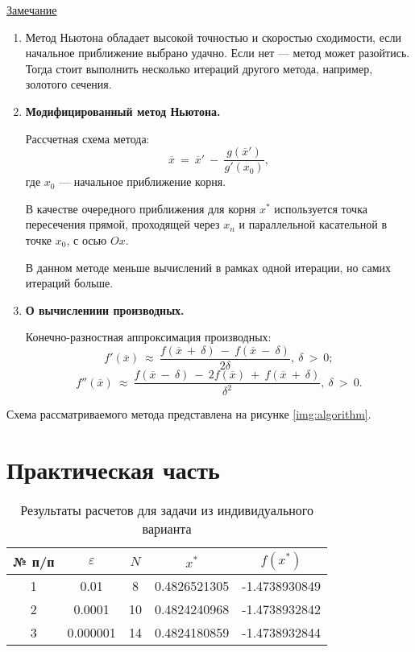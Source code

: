 \documentclass{bmstu}
\begin{document}
\underline{Замечание}
\begin{enumerate}
    \item Метод Ньютона обладает высокой точностью и скоростью сходимости, если начальное приближение выбрано удачно. Если нет --- метод может разойтись. Тогда стоит выполнить несколько итераций другого метода, например, золотого сечения.
    \item \textbf{Модифицированный метод Ньютона.}
    
        Рассчетная схема метода:
        \begin{equation}
            \overline{x} \ = \ \overline{x}' \ - \ \frac{g(\overline{x}')}{g'(x_0)},
        \end{equation}
        где $x_0$ --- начальное приближение корня.

        В качестве очередного приближения для корня $x^*$ используется точка пересечения прямой, проходящей через $x_n$ и параллельной касательной в точке $x_0$, с осью $Ox$.

        В данном методе меньше вычислений в рамках одной итерации, но самих итераций больше.
    \item \textbf{О вычислениии производных.}
        
        Конечно-разностная аппроксимация производных:
        \begin{equation}
            f'(\overline{x}) \ \approx \ \frac{f(\overline{x} \ + \ \delta) \ - \ f(\overline{x} \ - \ \delta)}{2 \delta}, \ \delta \ > \ 0;
        \end{equation}
        \begin{equation}
            f''(\overline{x}) \ \approx \ \frac{f(\overline{x} \ - \ \delta) \ - \ 2f(\overline{x}) \ + \ f(\overline{x} \ + \ \delta)}{\delta^2}, \ \delta \ > \ 0.
        \end{equation}
\end{enumerate}

Схема рассматриваемого метода представлена на рисунке \ref{img:algorithm}. 



\chapter{Практическая часть}

\begin{table}[H]
    \centering
	\caption{Результаты расчетов для задачи из индивидуального варианта}
    \label{tbl:task}
	\begin{tabular}{|c|c|c|c|c|}
        \hline
        № п/п & $\varepsilon$ & $N$ & $x^*$ & $f(x^*)$ \\ \hline
        1 & 0.01 & 8 & 0.4826521305 & -1.4738930849 \\ \hline
        2 & 0.0001 & 10 & 0.4824240968 & -1.4738932842 \\ \hline
        3 & 0.000001 & 14 & 0.4824180859 & -1.4738932844 \\ \hline
    \end{tabular}
\end{table}
\end{document}
